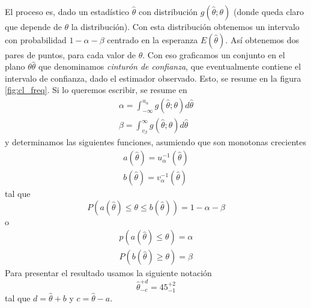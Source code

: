 \documentclass{article}
\numberwithin{equation}{section} %
\begin{document}
El proceso es, dado un estadístico $\hat{\theta}$ con distribución $g(\hat{\theta};\theta)$ (donde queda claro que depende de $\theta$ la distribución). Con esta distribución obtenemos un intervalo con probabilidad $1 - \alpha - \beta$ centrado en la esperanza $E(\hat{\theta})$. Así obtenemos dos pares de puntos, para cada valor de $\theta$. Con eso graficamos un conjunto en el plano $\theta \hat{\theta}$ que denominamos \emph{cinturón de confianza}, que eventualmente contiene el intervalo de confianza, dado el estimador observado. Esto, se resume en la figura \ref{fig:cl_freq}. Si lo queremos escribir, se resume en
\begin{equation}
\begin{gathered}
\alpha = \int_{-\infty}^{u_\alpha} g(\hat{\theta};\theta) d\hat{\theta} \\
\beta = \int_{v_\beta}^{\infty} g(\hat{\theta};\theta) d\hat{\theta}
\end{gathered}
\end{equation}
y determinamos las siguientes funciones, asumiendo que son monotonas crecientes
\begin{equation}
\begin{gathered}
a(\hat{\theta}) = u_\alpha^{-1}(\hat{\theta}) \\
b(\hat{\theta}) = v_\alpha^{-1}(\hat{\theta})
\end{gathered}
\end{equation}
tal que
\begin{equation}
P(a(\hat{\theta}) \leq \theta \leq b(\hat{\theta})) = 1 - \alpha - \beta
\end{equation}
o 
\begin{equation}
\begin{gathered}
p(a(\hat{\theta}) \leq \theta) = \alpha \\
P(b(\hat{\theta}) \geq \theta) = \beta
\end{gathered}
\end{equation}
Para presentar el resultado usamos la siguiente notación
\begin{equation}
\hat{\theta}^{+d}_{-c} = 45^{+2}_{-1}
\end{equation}
tal que $d = \hat{\theta} + b$ y $c = \hat{\theta} - a$.
\end{document}
